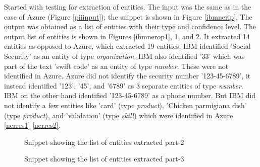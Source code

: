 Started with testing for extraction of entities. The input was the same as in the case of Azure (Figure \ref{piiinput}); the snippet is shown in Figure \ref{ibmnerip}. The output was obtained as a list of entities with their type and confidence level. The output list of entities is shown in Figures \ref{ibmnerop1}, \ref{ibmnerop2}, and \ref{ibmnerop3}. It extracted 14 entities as opposed to Azure, which extracted 19 entities. IBM identified 'Social Security' as an entity of type \textit{organization}. IBM also identified '33' which was part of the text 'swift code' as an entity of type \textit{number}. These were not identified in Azure. Azure did not identify the security number '123-45-6789', it instead identified '123', '45', and '6789' as 3 separate entities of type \textit{number}. IBM on the other hand identified '123-45-6789' as a phone number. But IBM did not identify a few entities like 'card' (type \textit{product}), 'Chicken parmigiana dish' (type \textit{product}), and 'validation' (type \textit{skill}) which were identified in Azure \ref{nerres1} \ref{nerres2}.
\begin {figure}[h!h]
        \centering
        \caption{Snippet showing the list of entities extracted part-2}
        \label{ibmnerop2}
    \end {figure}
\begin {figure}[h!h]
        \centering
        \caption{Snippet showing the list of entities extracted part-3}
        \label{ibmnerop3}
    \end {figure}


